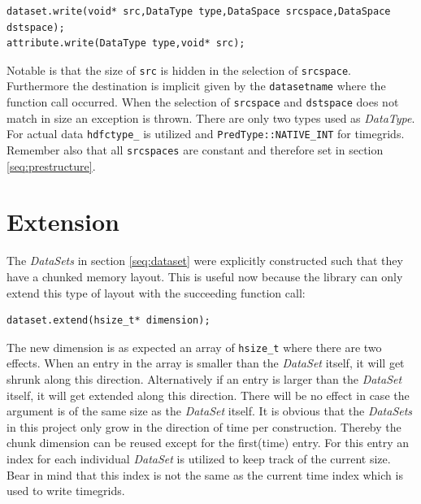 \begin{lstlisting}
dataset.write(void* src,DataType type,DataSpace srcspace,DataSpace dstspace);
attribute.write(DataType type,void* src);
\end{lstlisting}
Notable is that the size of \texttt{src} is hidden in the selection of \texttt{srcspace}. Furthermore the destination is implicit given by the \texttt{datasetname} where the function call occurred. When the selection of \texttt{srcspace} and \texttt{dstspace} does not match in size an exception is thrown. There are only two types used as \textit{DataType}. For actual data \texttt{hdfctype\_} is utilized and \texttt{PredType::NATIVE\_INT} for timegrids. Remember also that all \texttt{srcspaces} are constant and therefore set in section \ref{seq:prestructure}.

\section{Extension}
\label{seq:extension}
The \textit{DataSets} in section \ref{seq:dataset} were explicitly constructed such that they have a chunked memory layout. This is useful now because the library can only extend this type of layout with the succeeding function call: 
\begin{lstlisting}
dataset.extend(hsize_t* dimension);
\end{lstlisting}
The new dimension is as expected an array of \texttt{hsize\_t} where there are two effects. When an entry in the array is smaller than the \textit{DataSet} itself, it will get shrunk along this direction. Alternatively if an entry is larger than the \textit{DataSet} itself, it will get extended along this direction. There will be no effect in case the argument is of the same size as the \textit{DataSet} itself. It is obvious that the \textit{DataSets} in this project only grow in the direction of time per construction. Thereby the chunk dimension can be reused except for the first(time) entry. For this entry an index for each individual \textit{DataSet} is utilized to keep track of the current size. Bear in mind that this index is not the same as the current time index which is used to write timegrids.

